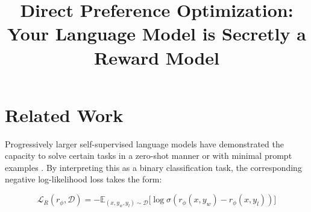 \title{Direct Preference Optimization: Your Language Model is Secretly a Reward Model}
\section{Related Work}

Progressively larger self-supervised language models have demonstrated the capacity to solve certain tasks in a zero-shot manner \citep{radford2019language} or with minimal prompt examples \citep{gpt3,megatron,chowdhery2022palm}. By interpreting this as a binary classification task, the corresponding negative log-likelihood loss takes the form:

\begin{equation}\label{eq:reward_model}
    \mathcal{L}_R(r_{\phi}, \mathcal{D}) = -\mathbb{E}_{(x, y_w, y_l)\sim \mathcal{D}}\bigl[\log \sigma(r_{\phi}(x, y_w)- r_{\phi}(x, y_l))\bigr]
\end{equation}

